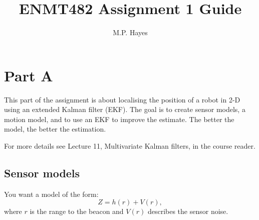 \documentclass[a4paper, 12pt]{article}
\title{ENMT482 Assignment 1 Guide}
\author{M.P. Hayes}
\date{}
\begin{document}
\maketitle


\section{Part A}

This part of the assignment is about localising the position of a
robot in 2-D using an extended Kalman filter (EKF).  The goal is to
create sensor models, a motion model, and to use an EKF to improve the
estimate.  The better the model, the better the estimation.

For more details see Lecture 11, Multivariate Kalman filters, in the
course reader.


\subsection{Sensor models}

You want a model of the form:
%
\begin{equation}
  Z = h(r) + V(r),
\end{equation}
%
where $r$ is the range to the beacon and $V(r)$ describes the sensor
noise.
\end{document}

